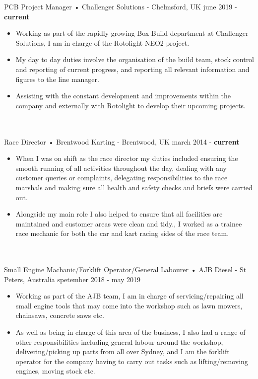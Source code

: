 
\begin{projects}
	\wideexperience
	{PCB Project Manager • Challenger Solutions - Chelmsford, UK}
	{june 2019 - \textbf{current}}
	{\begin{itemize}
    \item Working as part of the rapidly growing Box Build department at
      Challenger Solutions, I am in charge of the Rotolight NEO2 project.
    \item My day to day duties involve the organisation of the build team,
      stock control and reporting of current progress, and reporting all
      relevant information and figures to the line manager.
    \item Assisting with the constant development and improvements
      within the company and externally with Rotolight to develop their
      upcoming projects.
  \end{itemize}}

	\\
  \\


	\wideexperience
	{Race Director • Brentwood Karting - Brentwood, UK}
	{march 2014 - \textbf{current}}
	{\begin{itemize}
    \item When I was on shift as the race director my duties included
      ensuring the smooth running of all activities throughout the day,
      dealing with any customer queries or complaints, delegating
      responsibilities to the race marshals and making sure all health and
      safety checks and briefs were carried out.
    \item Alongside my main role I also helped to ensure that all facilities are
      maintained and customer areas were clean and tidy., I worked as a
      trainee race mechanic for both the car and kart racing sides of the
      race team.
  \end{itemize}}

	\\
  \\


	\wideexperience
	{Small Engine Machanic/Forklift Operator/General Labourer • AJB Diesel - St Peters, Australia}
	{spetember 2018 - may 2019}
	{\begin{itemize}
    \item Working as part of the AJB team, I am in charge of
      servicing/repairing all small engine tools that may come into the
      workshop such as lawn mowers, chainsaws, concrete saws etc.
    \item As well as being in charge of this area of the business, I also had a
      range of other responsibilities including general labour around the
      workshop, delivering/picking up parts from all over Sydney, and I
      am the forklift operator for the company having to carry out tasks
      such as lifting/removing engines, moving stock etc.
  \end{itemize}}


\end{projects}
